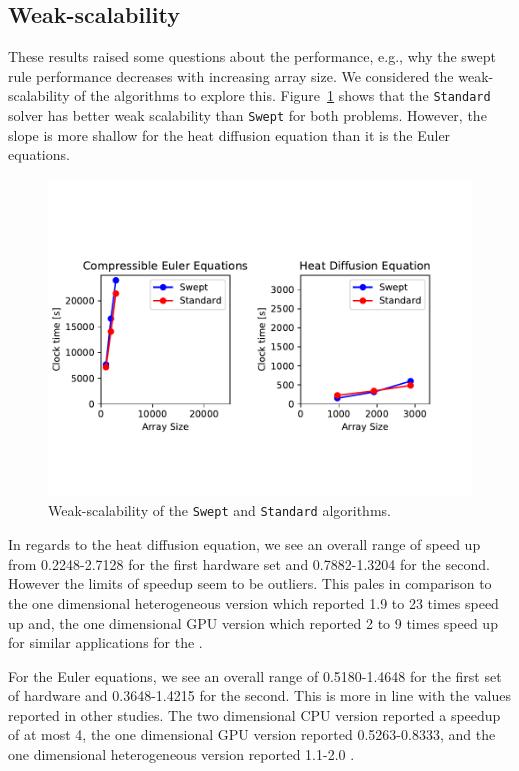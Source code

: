 \documentclass[review]{elsarticle}
\def\Swept{\texttt{Swept}}
\def\Standard{\texttt{Standard}}
\begin{document}
\subsection{Weak-scalability}
These results raised some questions about the performance, e.g., why the swept rule performance decreases with increasing array size. We considered the weak-scalability of the algorithms to explore this. Figure~\ref{fig:scalability} shows that the \Standard{} solver has better weak scalability than \Swept{} for both problems. However, the slope is more shallow for the heat diffusion equation than it is the Euler equations. 
\begin{figure}
    \centering
    \includegraphics[scale=1, trim={5cm 2cm 5cm 3.5cm}]{figs/weakScalability.pdf}
    \caption{Weak-scalability of the \Swept{} and \Standard{} algorithms.}
    \label{fig:scalability}
\end{figure}

In regards to the heat diffusion equation, we see an overall range of speed up from 0.2248-2.7128 for the first hardware set and 0.7882-1.3204 for the second. However the limits of speedup seem to be outliers. This pales in comparison to the one dimensional heterogeneous version which reported 1.9 to 23 times speed up and, the one dimensional GPU version which reported 2 to 9 times speed up for similar applications for the  \cite{Magee2018AcceleratingDecomposition,Magee2020ApplyingSystems}. 

For the Euler equations, we see an overall range of 0.5180-1.4648 for the first set of hardware and 0.3648-1.4215 for the second. This is more in line with the values reported in other studies. The two dimensional CPU version reported a speedup of at most 4, the one dimensional GPU version reported 0.5263-0.8333, and the one dimensional heterogeneous version reported 1.1-2.0 \cite{Alhubail2018ThePDEs,Magee2018AcceleratingDecomposition,Magee2020ApplyingSystems}.
\end{document}
